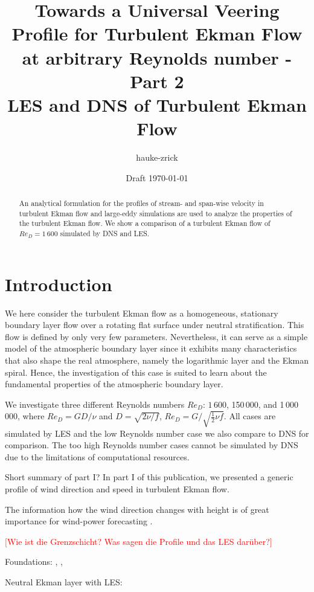 \documentclass[a4paper,11pt]{article}
\author{hauke-zrick}
\date{Draft \today}
\title{Towards a Universal Veering Profile for Turbulent Ekman Flow at arbitrary Reynolds number - Part 2\\
  \normalsize LES and DNS of Turbulent Ekman Flow \\}
\newcommand{\todo}[1]{\textcolor{red}{$[$#1$]$}}
\begin{document}
 

\maketitle

\begin{abstract}
  An analytical formulation for the profiles of stream- and span-wise velocity in turbulent Ekman flow and large-eddy simulations are used to analyze the properties of the turbulent Ekman flow. 
%
	We show a comparison of a turbulent Ekman flow of $Re_D=1\,600$ simulated by DNS and LES.
\end{abstract}
%
%
\section{Introduction}

We here consider the turbulent Ekman flow as a homogeneous, stationary boundary layer flow over a rotating flat surface under neutral stratification. This flow is defined by only very few parameters. Nevertheless, it can serve as a simple model of the atmospheric boundary layer since it exhibits many characteristics that also shape the real atmosphere, namely the logarithmic layer and the Ekman spiral. Hence, the investigation of this case is suited to learn about the fundamental properties of the atmospheric boundary layer.

We investigate three different Reynolds numbers $Re_D$: $1\,600$, 150\,000, and 1\,000\,000, where $Re_D = GD/\nu$ and $D=\sqrt{2\nu/f}$, $Re_D = G/\sqrt{\frac{1}{2}\nu f}$. All cases are simulated by LES and the low Reynolds number case we also compare to DNS for comparison. The too high Reynolds number cases cannot be simulated by DNS due to the limitations of computational resources.

Short summary of part I? In part I of this publication, we presented a generic profile of wind direction and speed in turbulent Ekman flow. 

The information how the wind direction changes with height is of great importance for wind-power forecasting \cite{optis2014moving}.

\todo{Wie ist die Grenzschicht? Was sagen die Profile und das LES darüber?}

Foundations: \cite{csanady1967resistance}, \cite{tennekes1973logarithmic}, \cite{spalart1989theoretical}

Neutral Ekman layer with LES: \cite{esau2004simulation}\cite{jiang2018large}
\end{document}
